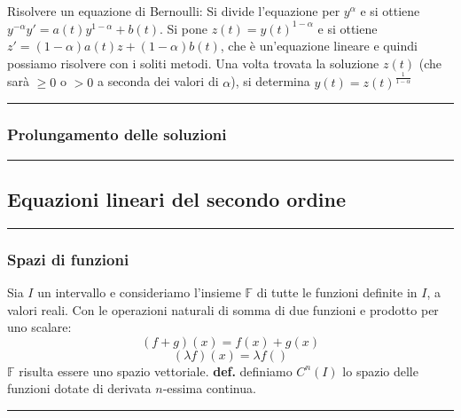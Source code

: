 \newline
Risolvere un equazione di Bernoulli:\newline
Si divide l'equazione per $y^\alpha$ e si ottiene $y^{-\alpha} y' = a(t) y^{1-\alpha} + b(t)$.\newline
Si pone $z(t) = y(t)^{1-\alpha}$ e si ottiene $z' = (1-\alpha)a(t)z + (1-\alpha) b(t)$, che è un'equazione lineare e quindi possiamo risolvere con i soliti metodi. Una volta trovata la soluzione $z(t)$ (che sarà $\geq 0$ o $>0$ a seconda dei valori di $\alpha$), si determina $y(t) = z(t)^{\frac{1}{1-\alpha}}$\newline
\rule{\textwidth}{0,4pt}
\subsubsection{Prolungamento delle soluzioni}

\rule{\textwidth}{2pt}
\subsection{Equazioni lineari del secondo ordine}
\rule{\textwidth}{0,4pt}
\subsubsection{Spazi di funzioni}
Sia $I$ un intervallo e consideriamo l'insieme $\mathbb{F}$ di tutte le funzioni definite in $I$, a valori reali. Con le operazioni naturali di somma di due funzioni e prodotto per uno scalare:
\[
    (f+g)(x) = f(x) + g(x)
\]
\[
    (\lambda f)(x) = \lambda f()
\]
$\mathbb{F}$ risulta essere uno spazio vettoriale. \newline
\newline
\textbf{def.} definiamo $C^n(I)$ lo spazio delle funzioni dotate di derivata $n$-essima continua.\newline
\rule{\textwidth}{0,4pt}
